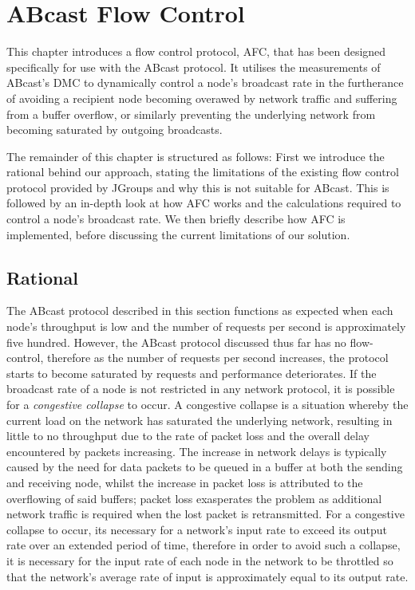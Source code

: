 \chapter{ABcast Flow Control}

    \graphicspath{{Chapter5-FlowControl/Figs/Vector/}{Chapter5-FlowControl/Figs/}}

This chapter introduces a flow control protocol, AFC, that has been designed specifically for use with the \textsf{ABcast} protocol.  It utilises the measurements of \textsf{ABcast}'s DMC to dynamically control a node's broadcast rate in the furtherance of avoiding a recipient node becoming overawed by network traffic and suffering from a buffer overflow, or similarly preventing the underlying network from becoming saturated by outgoing broadcasts.  

The remainder of this chapter is structured as follows: First we introduce the rational behind our approach, stating the limitations of the existing flow control protocol provided by JGroups and why this is not suitable for \textsf{ABcast}.  This is followed by an in-depth look at how AFC works and the calculations required to control a node's broadcast rate.  We then briefly describe how AFC is implemented, before discussing the current limitations of our solution.  

\section{Rational}
The \textsf{ABcast} protocol described in this section functions as expected when each node's throughput is low and the number of requests per second is approximately five hundred.  However, the \textsf{ABcast} protocol discussed thus far has no flow-control, therefore as the number of requests per second increases, the protocol starts to become saturated by requests and performance deteriorates.  If the broadcast rate of a node is not restricted in any network protocol, it is possible for a \emph{congestive collapse} \citep{CongestiveCollapse, Jacobson:1988:CAC:52324.52356} to occur.  A congestive collapse is a situation whereby the current load on the network has saturated the underlying network, resulting in little to no throughput due to the rate of packet loss and the overall delay encountered by packets increasing.  The increase in network delays is typically caused by the need for data packets to be queued in a buffer at both the sending and receiving node, whilst the increase in packet loss is attributed to the overflowing of said buffers; packet loss exasperates the problem as additional network traffic is required when the lost packet is retransmitted.  For a congestive collapse to occur, its necessary for a network's input rate to exceed its output rate over an extended period of time, therefore in order to avoid such a collapse, it is necessary for the input rate of each node in the network to be throttled so that the network's average rate of input is approximately equal to its output rate.  

